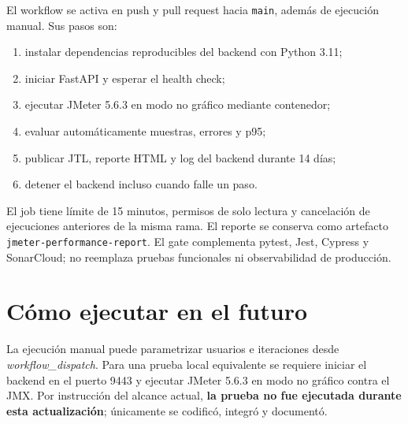El workflow  se activa en push y
pull request hacia \texttt{main}, además de ejecución manual. Sus pasos son:

\begin{enumerate}
    \item instalar dependencias reproducibles del backend con Python 3.11;
    \item iniciar FastAPI y esperar el health check;
    \item ejecutar JMeter 5.6.3 en modo no gráfico mediante contenedor;
    \item evaluar automáticamente muestras, errores y p95;
    \item publicar JTL, reporte HTML y log del backend durante 14 días;
    \item detener el backend incluso cuando falle un paso.
\end{enumerate}

El job tiene límite de 15 minutos, permisos de solo lectura y cancelación de
ejecuciones anteriores de la misma rama. El reporte se conserva como artefacto
\texttt{jmeter-performance-report}. El gate complementa pytest, Jest, Cypress y
SonarCloud; no reemplaza pruebas funcionales ni observabilidad de producción.

\section{Cómo ejecutar en el futuro}

La ejecución manual puede parametrizar usuarios e iteraciones desde
\textit{workflow\_dispatch}. Para una prueba local equivalente se requiere iniciar
el backend en el puerto 9443 y ejecutar JMeter 5.6.3 en modo no gráfico contra el
JMX. Por instrucción del alcance actual, \textbf{la prueba no fue ejecutada durante
esta actualización}; únicamente se codificó, integró y documentó.
